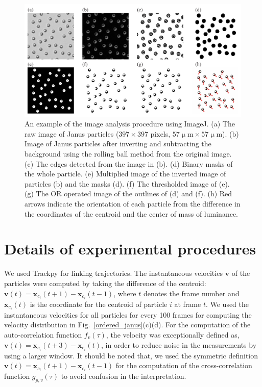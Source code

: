 \documentclass[%
 reprint,
 amsmath,amssymb,
 aps,
 floatfix
]{revtex4-2}
\newcommand{\mum}{\upmu\textrm{m}}
\begin{document}
\begin{figure}[!bt]
\includegraphics[width=\columnwidth]{sup_imagej.pdf}
\caption{\label{imagej} An example of the image analysis procedure using ImageJ. 
(a) The raw image of Janus particles ($397\times397$ pixels, $57\mum\times57\mum$). 
(b) Image of Janus particles after inverting and subtracting the background using the rolling ball method from the original image. 
(c) The edges detected from the image in (b). 
(d) Binary masks of the whole particle. 
(e) Multiplied image of the inverted image of particles (b) and the masks (d). 
(f) The thresholded image of (e). 
(g) The OR operated image of the outlines of (d) and (f). 
(h) Red arrows indicate the orientation of each particle from the difference in the coordinates of the centroid and the center of mass of luminance.
}
\end{figure}


\section{Details of experimental procedures}

We used Trackpy \cite{trackpy} for linking trajectories.
The instantaneous velocities $\bm{v}$ of the particles were computed by taking the difference of the centroid:
$\bm{v}(t) = \bm{x}_{c_i}(t+1) - \bm{x}_{c_i}(t-1)$,
where $t$ denotes the frame number and $\bm{x}_{c_i}(t)$ is the coordinate for the centroid of particle $i$ at frame $t$. We used the instantaneous velocities for all particles for every 100 frames for computing the velocity distribution in Fig.~\ref{ordered_janus}(c)(d).
For the computation of the auto-correlation function $f_v(\tau)$, the velocity was exceptionally defined as,
$\bm{v}(t) = \bm{x}_{c_i}(t+3) - \bm{x}_{c_i}(t)$,
in order to reduce noise in the measurements by using a larger window.
It should be noted that, we used the symmetric definition $\bm{v}(t) = \bm{x}_{c_i}(t+1) - \bm{x}_{c_i}(t-1)$ for the computation of the cross-correlation function $g_{p,v}(\tau)$ to avoid confusion in the interpretation.
\end{document}
